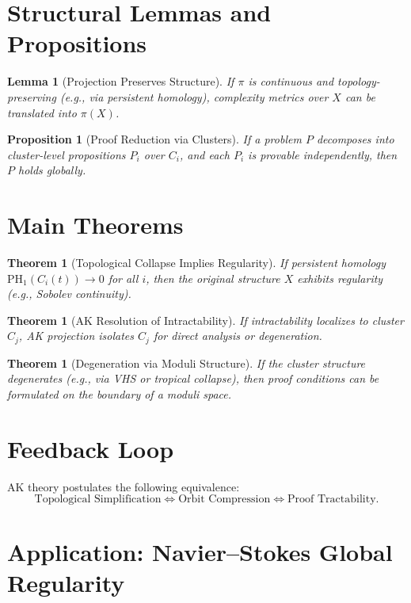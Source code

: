 \documentclass[11pt]{article}
\newtheorem{lemma}[definition]{Lemma}
\newtheorem{proposition}[definition]{Proposition}
\newtheorem{theorem}[definition]{Theorem}
\begin{document}
\section{Structural Lemmas and Propositions}

\begin{lemma}[Projection Preserves Structure]
If $\pi$ is continuous and topology-preserving (e.g., via persistent homology), complexity metrics over $X$ can be translated into $\pi(X)$.
\end{lemma}

\begin{proposition}[Proof Reduction via Clusters]
If a problem $P$ decomposes into cluster-level propositions $P_i$ over $C_i$, and each $P_i$ is provable independently, then $P$ holds globally.
\end{proposition}

\section{Main Theorems}

\begin{theorem}[Topological Collapse Implies Regularity]
If persistent homology $\mathrm{PH}_1(C_i(t)) \to 0$ for all $i$, then the original structure $X$ exhibits regularity (e.g., Sobolev continuity).
\end{theorem}

\begin{theorem}[AK Resolution of Intractability]
If intractability localizes to cluster $C_j$, AK projection isolates $C_j$ for direct analysis or degeneration.
\end{theorem}

\begin{theorem}[Degeneration via Moduli Structure]
If the cluster structure degenerates (e.g., via VHS or tropical collapse), then proof conditions can be formulated on the boundary of a moduli space.
\end{theorem}

\section{Feedback Loop}

AK theory postulates the following equivalence:
\[
\text{Topological Simplification} \Longleftrightarrow \text{Orbit Compression} \Longleftrightarrow \text{Proof Tractability}.
\]

\section{Application: Navier--Stokes Global Regularity}
\end{document}
